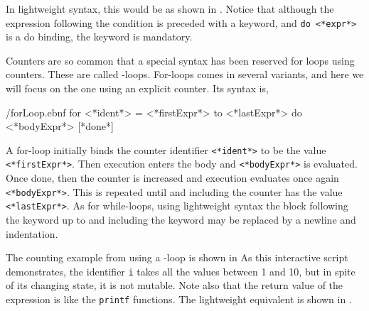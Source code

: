 In lightweight syntax, this would be as shown in .
%
%
Notice that although the expression following the condition is preceded with a  keyword, and \lstinline[language=syntax]{do <*expr*>} is a do binding, the keyword  is mandatory. 

Counters are so common that a special syntax has been reserved for loops using counters. These are called -loops. For-loops comes in several variants, and here we will focus on the one using an explicit counter. Its syntax is,
%
\begin{verbatimwrite}{\ebnf/forLoop.ebnf}
for <*ident*> = <*firstExpr*> to <*lastExpr*> do <*bodyExpr*> [*done*]
\end{verbatimwrite}
%
A for-loop initially binds the counter identifier \lstinline[language=syntax]{<*ident*>} to be the value \lstinline[language=syntax]{<*firstExpr*>}. Then execution enters the body and \lstinline[language=syntax]{<*bodyExpr*>} is evaluated. Once done, then the counter is increased and execution evaluates once again \lstinline[language=syntax]{<*bodyExpr*>}. This is repeated until and including the counter has the value \lstinline[language=syntax]{<*lastExpr*>}. As for while-loops, using lightweight syntax the block following the  keyword up to and including the  keyword may be replaced by a newline and indentation.

The counting example from  using a -loop is shown in 
%
%
As this interactive script demonstrates, the identifier \lstinline!i! takes all the values between 1 and 10, but in spite of its changing state, it is not mutable. Note also that the return value of the  expression is \lexeme{()} like the \lstinline!printf! functions. The lightweight equivalent is shown in .
%
%

